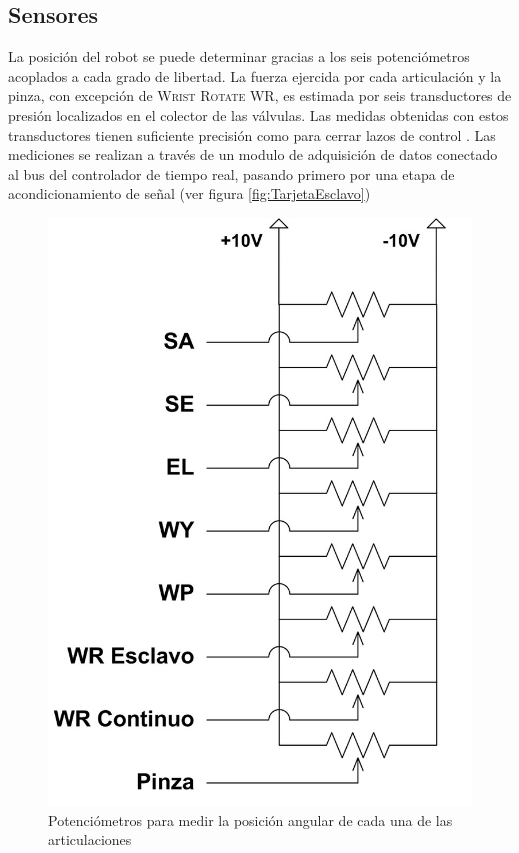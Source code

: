 \subsection*{Sensores}
La posición del robot se puede determinar gracias a los seis potenciómetros acoplados a cada grado de libertad. La fuerza ejercida por cada articulación y la pinza, con excepción de \textsc{Wrist Rotate} WR, es estimada por seis transductores de presión localizados en el colector de las válvulas. Las medidas obtenidas con estos transductores tienen suficiente precisión como para cerrar lazos de control \cite{Ferre2007a}. Las mediciones se realizan a través de un modulo de adquisición de datos conectado al bus del controlador de tiempo real, pasando primero por una etapa de acondicionamiento de señal (ver figura \ref{fig:TarjetaEsclavo})




\begin{figure}[htb]
\centering
\includegraphics[scale=0.4]{FiguresP/Potenciometros}
\caption{Potenci\'ometros para medir la posición angular de cada una de las articulaciones}
\label{fig:potenciometros}
\end{figure}


